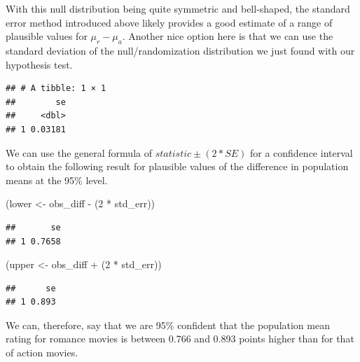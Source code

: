 \documentclass[]{tufte-book}
\newenvironment{Shaded}{\begin{snugshade}}{\end{snugshade}}
\newcommand{\KeywordTok}[1]{\textcolor[rgb]{0.13,0.29,0.53}{\textbf{{#1}}}}
\newcommand{\DataTypeTok}[1]{\textcolor[rgb]{0.13,0.29,0.53}{{#1}}}
\newcommand{\DecValTok}[1]{\textcolor[rgb]{0.00,0.00,0.81}{{#1}}}
\newcommand{\StringTok}[1]{\textcolor[rgb]{0.31,0.60,0.02}{{#1}}}
\newcommand{\NormalTok}[1]{{#1}}
\theoremstyle{definition}
\theoremstyle{definition}
\theoremstyle{remark}
\begin{document}
With this null distribution being quite symmetric and bell-shaped, the
standard error method introduced above likely provides a good estimate
of a range of plausible values for \(\mu_r - \mu_a\). Another nice
option here is that we can use the standard deviation of the
null/randomization distribution we just found with our hypothesis test.

\begin{Shaded}
\end{Shaded}

\begin{verbatim}
## # A tibble: 1 × 1
##        se
##     <dbl>
## 1 0.03181
\end{verbatim}

We can use the general formula of \(statistic \pm (2 * SE)\) for a
confidence interval to obtain the following result for plausible values
of the difference in population means at the 95\% level.

\begin{Shaded}
\begin{Highlighting}[]
\NormalTok{(lower <-}\StringTok{ }\NormalTok{obs_diff -}\StringTok{ }\NormalTok{(}\DecValTok{2} \NormalTok{*}\StringTok{ }\NormalTok{std_err))}
\end{Highlighting}
\end{Shaded}

\begin{verbatim}
##       se
## 1 0.7658
\end{verbatim}

\begin{Shaded}
\begin{Highlighting}[]
\NormalTok{(upper <-}\StringTok{ }\NormalTok{obs_diff +}\StringTok{ }\NormalTok{(}\DecValTok{2} \NormalTok{*}\StringTok{ }\NormalTok{std_err))}
\end{Highlighting}
\end{Shaded}

\begin{verbatim}
##      se
## 1 0.893
\end{verbatim}

We can, therefore, say that we are 95\% confident that the population
mean rating for romance movies is between 0.766 and 0.893 points higher
than for that of action movies.
\end{document}
